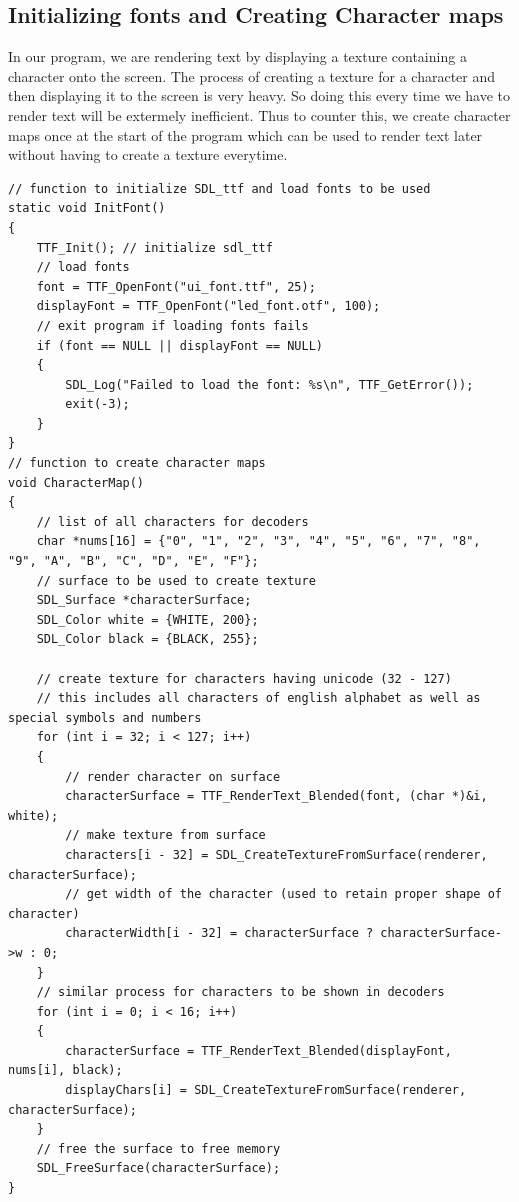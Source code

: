 \documentclass[report]{subfiles}
\begin{document}
    \subsection {Initializing fonts and Creating Character maps}
    In our program, we are rendering text by displaying a texture containing a character onto the screen. The process of creating a texture for a character and then displaying it to the screen is very heavy. So doing this every time we have to render text will be extermely inefficient. Thus to counter this, we create character maps once at the start of the program which can be used to render text later without having to create a texture everytime.
    \begin{lstlisting}
// function to initialize SDL_ttf and load fonts to be used
static void InitFont()
{
    TTF_Init(); // initialize sdl_ttf
    // load fonts
    font = TTF_OpenFont("ui_font.ttf", 25);
    displayFont = TTF_OpenFont("led_font.otf", 100);
    // exit program if loading fonts fails
    if (font == NULL || displayFont == NULL)
    {
        SDL_Log("Failed to load the font: %s\n", TTF_GetError());
        exit(-3);
    }
}
// function to create character maps
void CharacterMap()
{
    // list of all characters for decoders
    char *nums[16] = {"0", "1", "2", "3", "4", "5", "6", "7", "8", "9", "A", "B", "C", "D", "E", "F"};
    // surface to be used to create texture
    SDL_Surface *characterSurface;
    SDL_Color white = {WHITE, 200};
    SDL_Color black = {BLACK, 255};

    // create texture for characters having unicode (32 - 127)
    // this includes all characters of english alphabet as well as special symbols and numbers
    for (int i = 32; i < 127; i++)
    {
        // render character on surface
        characterSurface = TTF_RenderText_Blended(font, (char *)&i, white);
        // make texture from surface
        characters[i - 32] = SDL_CreateTextureFromSurface(renderer, characterSurface);
        // get width of the character (used to retain proper shape of character)
        characterWidth[i - 32] = characterSurface ? characterSurface->w : 0;
    }
    // similar process for characters to be shown in decoders
    for (int i = 0; i < 16; i++)
    {
        characterSurface = TTF_RenderText_Blended(displayFont, nums[i], black);
        displayChars[i] = SDL_CreateTextureFromSurface(renderer, characterSurface);
    }
    // free the surface to free memory
    SDL_FreeSurface(characterSurface);
}
    \end{lstlisting}
\end{document}
